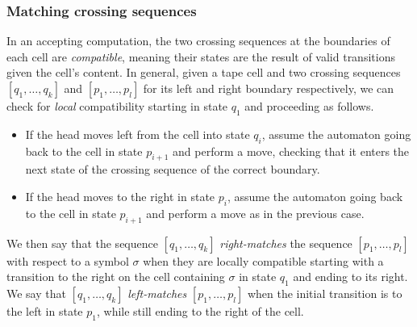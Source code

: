 \subsubsection{Matching crossing sequences}
In an accepting computation, the two crossing sequences at the boundaries of each cell are \emph{compatible}, meaning their states are the result of valid transitions given the cell's content.
In general, given a tape cell and two crossing sequences $[q_1,\dots,q_k]$ and $[p_1,\dots,p_l]$ for its left and right boundary respectively, we can check for \emph{local} compatibility starting in state $q_1$ and proceeding as follows.
\begin{itemize}
	\item If the head moves left from the cell into state $q_i$, assume the automaton going back to the cell in state $p_{i+1}$ and perform a move, checking that it enters the next state of the crossing sequence of the correct boundary.
	\item If the head moves to the right in state $p_i$, assume the automaton going back to the cell in state $p_{i+1}$ and perform a move as in the previous case.
\end{itemize}

We then say that the sequence $[q_1,\dots,q_k]$ \emph{right-matches} the sequence $[p_1,\dots,p_l]$ with respect to a symbol $\sigma$ when they are locally compatible starting with a transition to the right on the cell containing $\sigma$ in state $q_1$ and ending to its right.
We say that $[q_1,\dots,q_k]$ \emph{left-matches} $[p_1,\dots,p_l]$ when the initial transition is to the left in state $p_1$, while still ending to the right of the cell.

